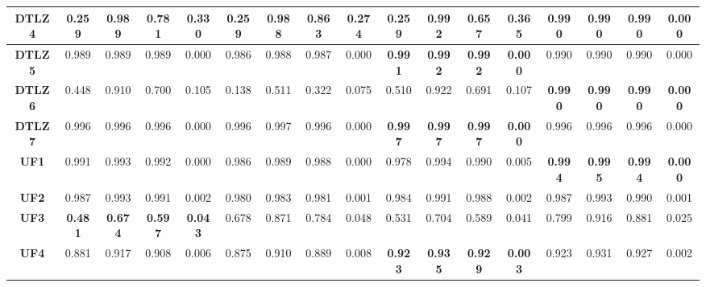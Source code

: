\begin{table*}[t]
\begin{scriptsize}
\begin{tabular}{cc|c|c|c|c|c|c|c|c|c|c|c|c|c|c|c}
\multicolumn{1}{c|}{\textbf{DTLZ4}} & 0.259          & 0.989          & 0.781          & 0.330          & 0.259          & 0.988          & 0.863          & 0.274          & 0.259          & 0.992          & 0.657          & 0.365          & \textbf{0.990} & \textbf{0.990} & \textbf{0.990} & \textbf{0.000} \\ \hline
\multicolumn{1}{c|}{\textbf{DTLZ5}} & 0.989          & 0.989          & 0.989          & 0.000          & 0.986          & 0.988          & 0.987          & 0.000          & \textbf{0.991} & \textbf{0.992} & \textbf{0.992} & \textbf{0.000} & 0.990          & 0.990          & 0.990          & 0.000          \\ \hline
\multicolumn{1}{c|}{\textbf{DTLZ6}} & 0.448          & 0.910          & 0.700          & 0.105          & 0.138          & 0.511          & 0.322          & 0.075          & 0.510          & 0.922          & 0.691          & 0.107          & \textbf{0.990} & \textbf{0.990} & \textbf{0.990} & \textbf{0.000} \\ \hline
\multicolumn{1}{c|}{\textbf{DTLZ7}} & 0.996          & 0.996          & 0.996          & 0.000          & 0.996          & 0.997          & 0.996          & 0.000          & \textbf{0.997} & \textbf{0.997} & \textbf{0.997} & \textbf{0.000} & 0.996          & 0.996          & 0.996          & 0.000          \\ \hline
\multicolumn{1}{c|}{\textbf{UF1}}   & 0.991          & 0.993          & 0.992          & 0.000          & 0.986          & 0.989          & 0.988          & 0.000          & 0.978          & 0.994          & 0.990          & 0.005          & \textbf{0.994} & \textbf{0.995} & \textbf{0.994} & \textbf{0.000} \\ \hline
\multicolumn{1}{c|}{\textbf{UF2}}   & 0.987          & 0.993          & 0.991          & 0.002          & 0.980          & 0.983          & 0.981          & 0.001          & 0.984          & 0.991          & 0.988          & 0.002          & 0.987          & 0.993          & 0.990          & 0.001          \\ \hline
\multicolumn{1}{c|}{\textbf{UF3}}   & \textbf{0.481} & \textbf{0.674} & \textbf{0.597} & \textbf{0.043} & 0.678          & 0.871          & 0.784          & 0.048          & 0.531          & 0.704          & 0.589          & 0.041          & 0.799          & 0.916          & 0.881          & 0.025          \\ \hline
\multicolumn{1}{c|}{\textbf{UF4}}   & 0.881          & 0.917          & 0.908          & 0.006          & 0.875          & 0.910          & 0.889          & 0.008          & \textbf{0.923} & \textbf{0.935} & \textbf{0.929} & \textbf{0.003} & 0.923          & 0.931          & 0.927          & 0.002          \\ \hline

\end{tabular}
\end{scriptsize}
\end{table*}
